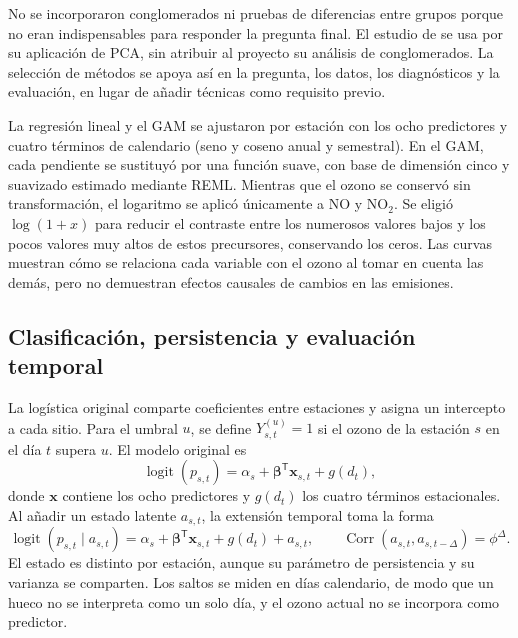 \documentclass[11pt,letterpaper]{article}
\begin{document}
No se incorporaron conglomerados ni pruebas de diferencias entre grupos porque no eran indispensables para responder la pregunta final. El estudio de \citet{nunez2019} se usa por su aplicación de PCA, sin atribuir al proyecto su análisis de conglomerados. La selección de métodos se apoya así en la pregunta, los datos, los diagnósticos y la evaluación, en lugar de añadir técnicas como requisito previo.

La regresión lineal y el GAM se ajustaron por estación con los ocho predictores y cuatro términos de calendario (seno y coseno anual y semestral). En el GAM, cada pendiente se sustituyó por una función suave, con base de dimensión cinco y suavizado estimado mediante REML. Mientras que el ozono se conservó sin transformación, el logaritmo se aplicó únicamente a NO y NO$_2$. Se eligió $\log(1+x)$ para reducir el contraste entre los numerosos valores bajos y los pocos valores muy altos de estos precursores, conservando los ceros. Las curvas muestran cómo se relaciona cada variable con el ozono al tomar en cuenta las demás, pero no demuestran efectos causales de cambios en las emisiones.
\clearpage

\subsection{Clasificación, persistencia y evaluación temporal}
La logística original comparte coeficientes entre estaciones y asigna un intercepto a cada sitio. Para el umbral $u$, se define $Y_{s,t}^{(u)}=1$ si el ozono de la estación $s$ en el día $t$ supera $u$. El modelo original es
\begin{equation}
\operatorname{logit}(p_{s,t})=\alpha_s+\boldsymbol\beta^{\mathsf T}\mathbf{x}_{s,t}+g(d_t),
\end{equation}
donde $\mathbf{x}$ contiene los ocho predictores y $g(d_t)$ los cuatro términos estacionales. Al añadir un estado latente $a_{s,t}$, la extensión temporal toma la forma
\begin{equation}
\operatorname{logit}(p_{s,t}\mid a_{s,t})=\alpha_s+\boldsymbol\beta^{\mathsf T}\mathbf{x}_{s,t}+g(d_t)+a_{s,t},\qquad
\operatorname{Corr}(a_{s,t},a_{s,t-\Delta})=\phi^{\Delta}.
\end{equation}
El estado es distinto por estación, aunque su parámetro de persistencia y su varianza se comparten. Los saltos se miden en días calendario, de modo que un hueco no se interpreta como un solo día, y el ozono actual no se incorpora como predictor.
\end{document}
